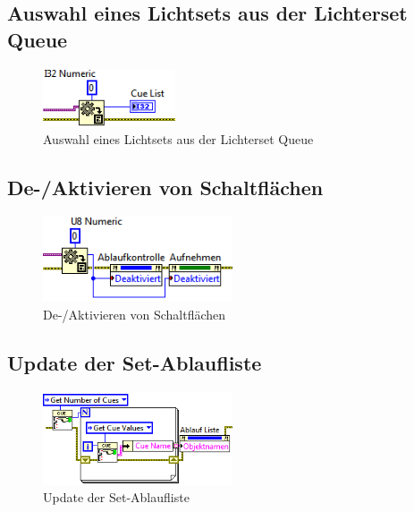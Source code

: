 	\subsection{Auswahl eines Lichtsets aus der Lichterset Queue}
	\begin{figure}[!h]
	\centering
		\includegraphics[width=0.35\textwidth]{Pics/front-auswahl.png}
	\caption{Auswahl eines Lichtsets aus der Lichterset Queue}
	\label{fig:a4}
	\end{figure}
	\newpage
	
	\subsection{De-/Aktivieren von Schaltflächen}	
	\begin{figure}[!h]
	\centering
		\includegraphics[width=0.5\textwidth]{Pics/front-deaktivieren.png}
	\caption{De-/Aktivieren von Schaltflächen}
	\label{fig:a5}
	\end{figure}

	\subsection{Update der Set-Ablaufliste}
	\begin{figure}[!h]
	\centering
		\includegraphics[width=0.5\textwidth]{Pics/front-updateCue.png}
	\caption{Update der Set-Ablaufliste}
	\label{fig:a6}
	\end{figure}
	\newpage	
	
